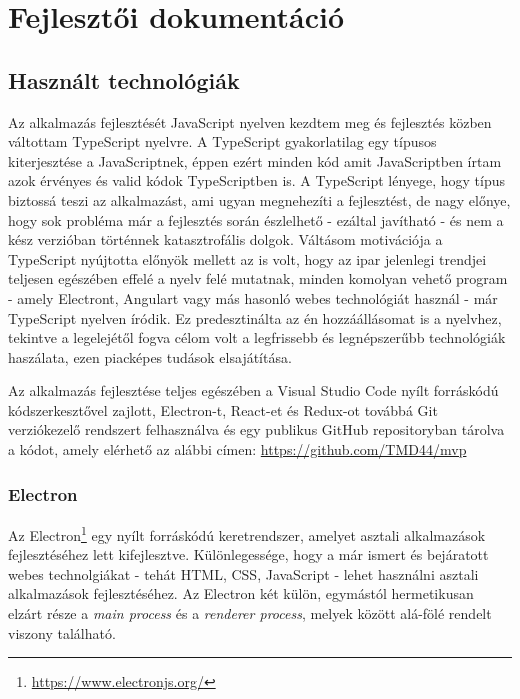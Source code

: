 \chapter{Fejlesztői dokumentáció} %
\label{ch:impl}

\section{Használt technológiák}
Az alkalmazás fejlesztését JavaScript nyelven kezdtem meg és fejlesztés közben váltottam TypeScript nyelvre. A TypeScript gyakorlatilag egy típusos kiterjesztése a JavaScriptnek, éppen ezért minden kód amit JavaScriptben írtam azok érvényes és valid kódok TypeScriptben is. A TypeScript lényege, hogy típus biztossá teszi az alkalmazást, ami ugyan megnehezíti a fejlesztést, de nagy előnye, hogy sok probléma már a fejlesztés során észlelhető - ezáltal javítható - és nem a kész verzióban történnek katasztrofális dolgok. Váltásom motivációja a TypeScript nyújtotta előnyök mellett az is volt, hogy az ipar jelenlegi trendjei teljesen egészében effelé a nyelv felé mutatnak, minden komolyan vehető program - amely Electront, Angulart vagy más hasonló webes technológiát használ - már TypeScript nyelven íródik. Ez predesztinálta az én hozzáállásomat is a nyelvhez, tekintve a legelejétől fogva célom volt a legfrissebb és legnépszerűbb technológiák haszálata, ezen piacképes tudások elsajátítása.

Az alkalmazás fejlesztése teljes egészében a Visual Studio Code nyílt forráskódú kódszerkesztővel zajlott, Electron-t, React-et és Redux-ot továbbá Git verziókezelő rendszert felhasználva és egy publikus GitHub repositoryban tárolva a kódot, amely elérhető az alábbi címen: \url{https://github.com/TMD44/mvp}

\subsection{Electron}
Az Electron\footnote{\url{https://www.electronjs.org/}} egy nyílt forráskódú keretrendszer, amelyet asztali alkalmazások fejlesztéséhez lett kifejlesztve. Különlegessége, hogy a már ismert és bejáratott webes technolgiákat - tehát HTML, CSS, JavaScript - lehet használni asztali alkalmazások fejlesztéséhez. Az Electron két külön, egymástól hermetikusan elzárt része a {\it main process} és a {\it renderer process}, melyek között alá-fölé rendelt viszony található.

